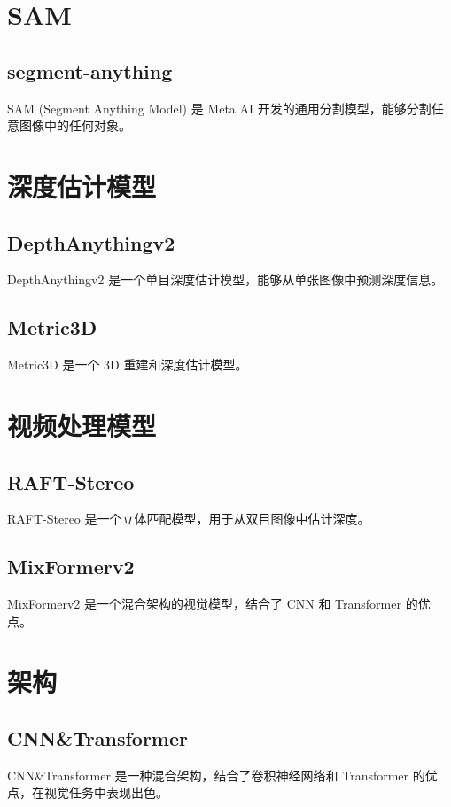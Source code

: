 \documentclass[12pt,UTF8]{ctexbook}
\begin{document}
\section{SAM}

\subsection{segment-anything}

SAM (Segment Anything Model) 是 Meta AI 开发的通用分割模型，能够分割任意图像中的任何对象。

\section{深度估计模型}

\subsection{DepthAnythingv2}

DepthAnythingv2 是一个单目深度估计模型，能够从单张图像中预测深度信息。

\subsection{Metric3D}

Metric3D 是一个 3D 重建和深度估计模型。

\section{视频处理模型}

\subsection{RAFT-Stereo}

RAFT-Stereo 是一个立体匹配模型，用于从双目图像中估计深度。

\subsection{MixFormerv2}

MixFormerv2 是一个混合架构的视觉模型，结合了 CNN 和 Transformer 的优点。

\section{架构}

\subsection{CNN\&Transformer}

CNN\&Transformer 是一种混合架构，结合了卷积神经网络和 Transformer 的优点，在视觉任务中表现出色。

\backmatter
\end{document}
